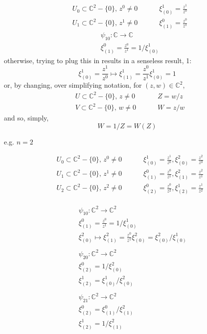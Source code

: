 \documentclass{book}
\begin{document}
\[
\begin{aligned}
& U_0 \subset \mathbb{C}^2 - \lbrace 0 \rbrace , \, z^0 \neq 0 \, \qquad \,  & \xi^1_{(0)} = \frac{z^1}{z^0} \\ 
  & U_1 \subset \mathbb{C}^2 - \lbrace 0 \rbrace , \, z^1 \neq 0 \, \qquad \,  & \xi^0_{(1)} = \frac{z^0}{z^1}   
\end{aligned}
\]
\[
\begin{aligned}
& \psi_{10} : \mathbb{C} \to \mathbb{C} \\
& \xi_{(1)}^0 = \frac{z^0}{z^1} = 1/\xi^1_{(0)}
  \end{aligned}
\]
otherwise, trying to plug this in results in a senseless result, 1:
\[
 \xi_{(0)}^1 = \frac{z^1}{z^0} \mapsto \xi^1_{(1)} = \frac{z^0}{z^1} \xi^1_{ (0)} = 1 
\]
or, by changing, over simplifying notation, for $(z,w) \in \mathbb{C}^2$,
\[
\begin{aligned}
& U \subset \mathbb{C}^2 - \lbrace 0 \rbrace , \, z \neq 0 \, \qquad \,  & Z = w/z  \\ 
  & V \subset \mathbb{C}^2 - \lbrace 0 \rbrace , \, w \neq 0 \, \qquad \,  & W = z/w    
\end{aligned}
\]
and so, simply,
\[
W = 1/Z = W(Z)
\]

e.g. $n=2$  

\[
\begin{aligned}
& U_0 \subset \mathbb{C}^2 - \lbrace 0 \rbrace , \, z^0 \neq 0 \, \qquad \,  & \xi^1_{(0)} = \frac{z^1}{z^0},  \xi^2_{(0)} = \frac{z^2}{z^0}  \\ 
  & U_1 \subset \mathbb{C}^2 - \lbrace 0 \rbrace , \, z^1 \neq 0 \, \qquad \,  & \xi^0_{(1)} = \frac{z^0}{z^1} , \xi^2_{(1)} = \frac{z^2}{z^1}   \\
  & U_2 \subset \mathbb{C}^2 - \lbrace 0 \rbrace , \, z^2 \neq 0 \, \qquad \,  & \xi^0_{(2)} = \frac{z^0}{z^2} , \xi^1_{(2)} = \frac{z^1}{z^2}  
\end{aligned}
\]

\[
\begin{aligned}
& \begin{aligned}
& \psi_{10} : \mathbb{C}^2 \to \mathbb{C}^2 \\
    & \xi_{(1)}^0 = \frac{z^0}{z^1} = 1/\xi^1_{(0)} \\
    & \xi_{(0)}^2 \mapsto \xi_{(1)}^2 = \frac{z^0}{z^1} \xi^2_{(0)} = \xi^2_{(0)} / \xi^1_{(0)} 
  \end{aligned} \\
  &  \begin{aligned}
& \psi_{20} : \mathbb{C}^2 \to \mathbb{C}^2 \\
       & \xi^0_{(2)} = 1/ \xi^2_{(0)} \\
       & \xi^1_{(2)} =  \xi^1_{(0)} / \xi^2_{(0)} 
     \end{aligned} \\
    &  \begin{aligned}
& \psi_{21} : \mathbb{C}^2 \to \mathbb{C}^2 \\
       & \xi^0_{(2)} = \xi^0_{(1)} / \xi^2_{(1)}  \\ 
       & \xi^1_{(2)} =  1/ \xi^2_{(1)} \\
       \end{aligned} 
\end{aligned}
\]
\end{document}
